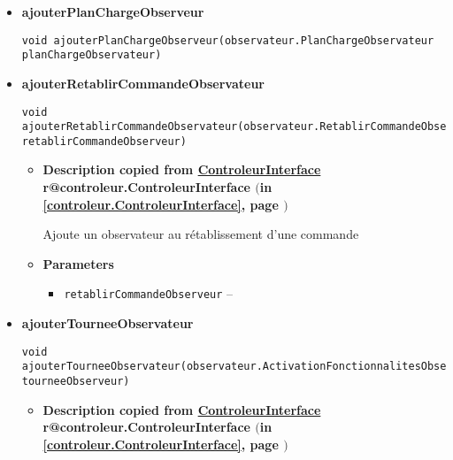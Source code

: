 \documentclass[11pt,a4paper]{report}
\makeatletter
\newcommand{\refdefined}[1]{
\expandafter\ifx\csname r@#1\endcsname\relax
\relax\else
{$($in \ref{#1}, page \pageref{#1}$)$}\fi}
\makeatother
\begin{document}
{{{{{\begin{itemize}
{\begin{itemize}
{Ajoute un observateur au changement du modèle
}
\item{
{\bf  Parameters}
  \begin{itemize}
   \item{
\texttt{observeur} -- }
  \end{itemize}
}%
\end{itemize}
}%
\item{ 
\hypertarget{controleur.Controleur.ajouterPlanChargeObserveur(controleur.observateur.PlanChargeObservateur)}{{\bf  ajouterPlanChargeObserveur}\\}
\begin{lstlisting}[frame=none]
void ajouterPlanChargeObserveur(observateur.PlanChargeObservateur planChargeObservateur)\end{lstlisting} %
}%
\item{ 
\hypertarget{controleur.Controleur.ajouterRetablirCommandeObservateur(controleur.observateur.RetablirCommandeObservateur)}{{\bf  ajouterRetablirCommandeObservateur}\\}
\begin{lstlisting}[frame=none]
void ajouterRetablirCommandeObservateur(observateur.RetablirCommandeObservateur retablirCommandeObserveur)\end{lstlisting} %
\begin{itemize}
\item{
{\bf  Description copied from \hyperlink{controleur.ControleurInterface}{ControleurInterface}{\small \refdefined{controleur.ControleurInterface}} }

Ajoute un observateur au rétablissement d'une commande
}
\item{
{\bf  Parameters}
  \begin{itemize}
   \item{
\texttt{retablirCommandeObserveur} -- }
  \end{itemize}
}%
\end{itemize}
}%
\item{ 
\hypertarget{controleur.Controleur.ajouterTourneeObservateur(controleur.observateur.ActivationFonctionnalitesObservateur)}{{\bf  ajouterTourneeObservateur}\\}
\begin{lstlisting}[frame=none]
void ajouterTourneeObservateur(observateur.ActivationFonctionnalitesObservateur tourneeObserveur)\end{lstlisting} %
\begin{itemize}
\item{
{\bf  Description copied from \hyperlink{controleur.ControleurInterface}{ControleurInterface}{\small \refdefined{controleur.ControleurInterface}} }

}
\end{itemize}}
\end{itemize}}}}}}
\end{document}

